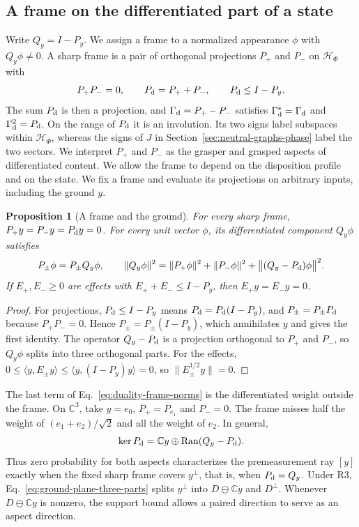 \documentclass[11pt]{article}
\newtheorem{proposition}{Proposition}[section]
\theoremstyle{definition}
\DeclareMathOperator{\Ran}{Ran}
\newcommand{\C}{\mathbb C}
\begin{document}
\subsection{A frame on the differentiated part of a state}
\label{subsec:duality-frame}

Write $Q_y=I-P_y$. We assign a frame to a normalized appearance $\phi$ with $Q_y\phi\ne0$. A sharp frame is a pair of orthogonal projections $P_+$ and $P_-$ on $\mathcal H_\Phi$ with
\begin{equation}
 P_+P_-=0,\qquad P_{\rm d}=P_++P_-,\qquad P_{\rm d}\leq I-P_y .
 \label{eq:duality-frame}
\end{equation}
The sum $P_{\rm d}$ is then a projection, and $\Gamma_{\rm d}=P_+-P_-$ satisfies $\Gamma_{\rm d}^*=\Gamma_{\rm d}$ and $\Gamma_{\rm d}^2=P_{\rm d}$. On the range of $P_{\rm d}$ it is an involution. Its two signs label subspaces within $\mathcal H_\Phi$, whereas the signs of $J$ in Section~\ref{sec:neutral-graphs-phase} label the two sectors. We interpret $P_+$ and $P_-$ as the grasper and grasped aspects of differentiated content. We allow the frame to depend on the disposition profile and on the state. We fix a frame and evaluate its projections on arbitrary inputs, including the ground $y$.

\begin{proposition}[A frame and the ground]
\label{prop:duality-frame-ground}
For every sharp frame, $P_+y=P_-y=P_{\rm d}y=0$. For every unit vector $\phi$, its differentiated component $Q_y\phi$ satisfies
\begin{equation}
 P_\pm\phi=P_\pm Q_y\phi,\qquad
 \|Q_y\phi\|^2=\|P_+\phi\|^2+\|P_-\phi\|^2+\bigl\|(Q_y-P_{\rm d})\phi\bigr\|^2 .
 \label{eq:duality-frame-norms}
\end{equation}
If $E_+,E_-\geq0$ are effects with $E_++E_-\leq I-P_y$, then $E_+y=E_-y=0$.
\end{proposition}
\begin{proof}
For projections, $P_{\rm d}\leq I-P_y$ means $P_{\rm d}=P_{\rm d}(I-P_y)$, and $P_\pm=P_\pm P_{\rm d}$ because $P_+P_-=0$. Hence $P_\pm=P_\pm(I-P_y)$, which annihilates $y$ and gives the first identity. The operator $Q_y-P_{\rm d}$ is a projection orthogonal to $P_+$ and $P_-$, so $Q_y\phi$ splits into three orthogonal parts. For the effects, $0\leq\langle y,E_\pm y\rangle\leq\langle y,(I-P_y)y\rangle=0$, so $\|E_\pm^{1/2}y\|=0$.
\end{proof}

The last term of Eq.~\eqref{eq:duality-frame-norms} is the differentiated weight outside the frame. On $\C^3$, take $y=e_0$, $P_+=P_{e_1}$ and $P_-=0$. The frame misses half the weight of $(e_1+e_2)/\sqrt2$ and all the weight of $e_2$. In general,
\[
 \ker P_{\rm d}=\C y\oplus\Ran(Q_y-P_{\rm d}).
\]
Thus zero probability for both aspects characterizes the premeasurement ray $[y]$ exactly when the fixed sharp frame covers $y^\perp$, that is, when $P_{\rm d}=Q_y$. Under R3, Eq.~\eqref{eq:ground-plane-three-parts} splits $y^\perp$ into $D\ominus\C y$ and $D^\perp$. Whenever $D\ominus\C y$ is nonzero, the support bound allows a paired direction to serve as an aspect direction.
\end{document}
